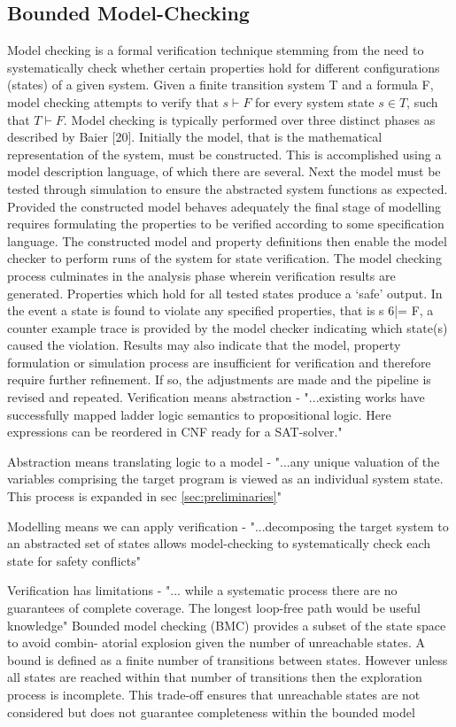 \documentclass[runningheads]{llncs}
\begin{document}
\subsection{Bounded Model-Checking}
Model checking is a formal verification technique stemming from the need to systematically
check whether certain properties hold for different configurations (states) of a given system.
Given a finite transition system T and a formula F, model checking attempts to verify
that $s \vdash F$ for every system state $s \in T$, such that $T \vdash F$. Model checking is typically
performed over three distinct phases as described by Baier [20]. Initially the model, that is
the mathematical representation of the system, must be constructed. This is accomplished
using a model description language, of which there are several. Next the model must
be tested through simulation to ensure the abstracted system functions as expected.
Provided the constructed model behaves adequately the final stage of modelling requires
formulating the properties to be verified according to some specification language. The
constructed model and property definitions then enable the model checker to perform runs
of the system for state verification. The model checking process culminates in the analysis
phase wherein verification results are generated. Properties which hold for all tested states
produce a ‘safe’ output. In the event a state is found to violate any specified properties, that
is s 6|= F, a counter example trace is provided by the model checker indicating which state(s)
caused the violation. Results may also indicate that the model, property formulation or
simulation process are insufficient for verification and therefore require further refinement.
If so, the adjustments are made and the pipeline is revised and repeated.
Verification means abstraction -  "...existing works have successfully mapped ladder logic semantics to propositional logic. Here expressions can be reordered in CNF ready for a SAT-solver."

Abstraction means translating logic to a model - "...any unique valuation of the variables comprising the target program is viewed as an individual system state. This process is expanded in sec \ref{sec:preliminaries}"

Modelling means we can apply verification - "...decomposing the target system to an abstracted set of states allows model-checking to systematically check each state for safety conflicts"

Verification has limitations - "... while a systematic process there are no guarantees of complete coverage. The longest loop-free path would be useful knowledge"
Bounded model checking (BMC) provides a subset of the state space to avoid combin-
atorial explosion given the number of unreachable states. A bound is defined as a finite
number of transitions between states. However unless all states are reached within that
number of transitions then the exploration process is incomplete. This trade-off ensures
that unreachable states are not considered but does not guarantee completeness within
the bounded model
\end{document}
